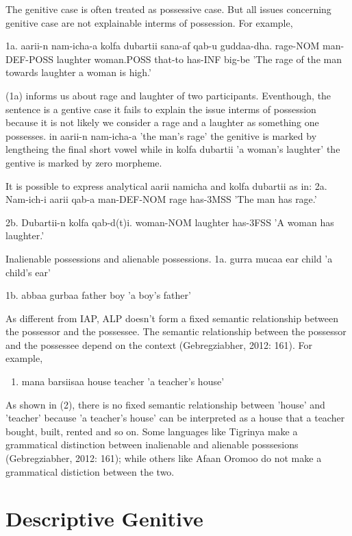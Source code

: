 \documentclass[11pt,a4paper]{article}
\begin{document}
	
	The genitive case is often treated as possessive case. But all issues concerning genitive case are not
	explainable interms of possession. For example,
	
	1a. aarii-n   nam-icha-a     kolfa     dubartii   sana-af qab-u   guddaa-dha.
	rage-NOM  man-DEF-POSS   laughter  woman.POSS that-to has-INF big-be
	'The rage of the man towards laughter a woman is high.'
	
	(1a) informs us about rage and laughter of two participants. Eventhough, the sentence is a gentive case it
	fails to explain the issue interms of possession because it is not likely we consider a rage and a laughter as 
	something one possesses. in aarii-n nam-icha-a 'the man's rage' the genitive is marked by lengtheing the final
	short vowel while in kolfa dubartii 'a woman's laughter' the gentive is marked by zero morpheme. 
	
	It is possible to express analytical aarii namicha and kolfa dubartii as in:
	2a. Nam-ich-i    aarii qab-a
	man-DEF-NOM  rage  has-3MSS
	'The man has rage.'
	
	2b. Dubartii-n kolfa     qab-d(t)i.
	woman-NOM  laughter  has-3FSS
	'A woman has laughter.'
	
	
	Inalienable possessions and alienable possessions.
	1a. gurra mucaa
	ear   child
	'a child's ear'
	
	1b. abbaa  gurbaa
	father boy
	'a boy's father'
	
	As different from IAP, ALP doesn't form a fixed semantic relationship between the possessor and the 
	possessee. The semantic relationship between the possessor and the possessee depend on the context (Gebregziabher, 2012: 161). 
	For example, 
	
	\begin{enumerate}
		\item mana    barsiisaa
		house   teacher
		'a teacher's house'
	\end{enumerate}
	
	As shown in (2), there is no fixed semantic relationship between 'house' and 'teacher' because 'a teacher's house'
	can be interpreted as a house that a teacher bought, built, rented and so on. Some languages like Tigrinya make 
	a grammatical distinction between inalienable and alienable posssesions (Gebregziabher, 2012: 161); while others like Afaan Oromoo
	do not make a grammatical distiction between the two. 
	
	\section{Descriptive Genitive}
	
\end{document}
